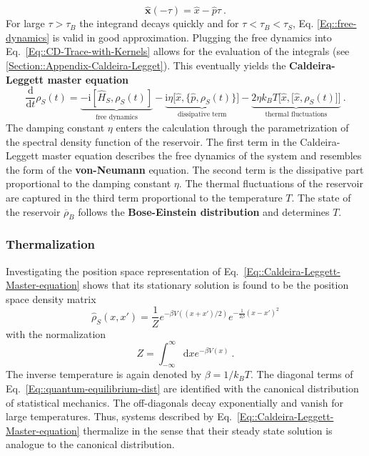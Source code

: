 	\begin{equation}\label{Eq::free-dynamics}
		\boldsymbol{\hat{x}}(-\tau) =	\hat{x} - \hat{p} \tau~.
	\end{equation}
	For large $\tau > \tau_B$ the integrand decays quickly and for $\tau < \tau_B < \tau_S$, Eq. \eqref{Eq::free-dynamics} is valid in good approximation. Plugging the free dynamics into Eq.~\eqref{Eq::CD-Trace-with-Kernels} allows for the evaluation of the integrals (see \autoref{Section::Appendix-Caldeira-Legget}). This eventually yields the \textbf{Caldeira-Leggett master equation}
	\begin{equation} \label{Eq::Caldeira-Leggett-Master-equation}
		\frac{\text{d}}{\text{d}t} \rho_S(t) =	\underbrace{-\mathrm{i}\left[\hat{H}_S, \rho_S(t) \right]}_{\text{free dynamics}} - \underbrace{\mathrm{i} \eta \Big [\hat{x}, \big\{\hat{p}, \rho_S(t)\big\}\Big ]}_\text{dissipative term} - \underbrace{2 \eta k_B T \Big [\hat{x}, \big[\hat{x}, \rho_S(t)\big]\Big ]}_\text{thermal fluctuations}~.
	\end{equation}
	The damping constant $\eta$ enters the calculation through the parametrization of the spectral density function of the reservoir. The first term in the Caldeira-Leggett master equation describes the free dynamics of the system and resembles the form of the \textbf{von-Neumann} equation. The second term is the dissipative part proportional to the damping constant $\eta$. The thermal fluctuations of the reservoir are captured in the third term proportional to the temperature $T$. The state of the reservoir $\overline{\rho}_B$ follows the \textbf{Bose-Einstein distribution} and determines $T$.
	\subsubsection{Thermalization}
	Investigating the position space representation of Eq.~\eqref{Eq::Caldeira-Leggett-Master-equation} shows that its stationary solution is found to be the position space density matrix
	\begin{equation} \label{Eq::quantum-equilibrium-dist}
		\hat{\rho}_S (x, x') = \frac{1}{Z}	e^{- \beta {V((x + x') /2)}} e^{-\frac{1}{2\beta} (x - x')^2}
	\end{equation}
	with the normalization
	\begin{equation}
		Z =	\int_{-\infty}^{\infty} \text{d}x e^{- \beta {V(x)}}~.
	\end{equation}
	The inverse temperature is again denoted by $\beta =	1 /	k_B T$. The diagonal terms of Eq.~\eqref{Eq::quantum-equilibrium-dist} are identified with the canonical distribution of statistical mechanics. The off-diagonals decay exponentially and vanish for large temperatures. Thus, systems described by Eq.~\eqref{Eq::Caldeira-Leggett-Master-equation} thermalize in the sense that their steady state solution is analogue to the canonical distribution. 
